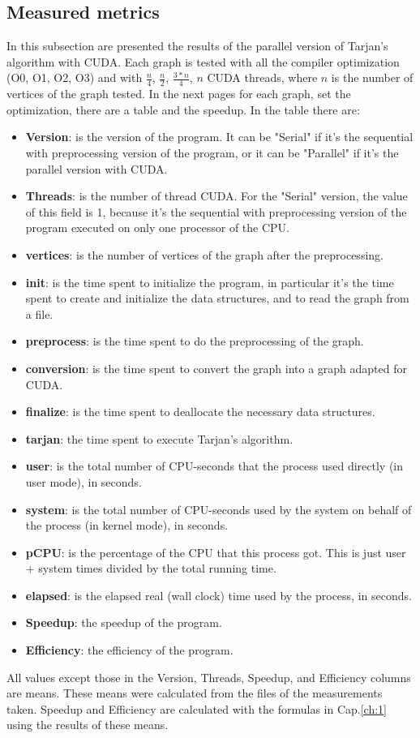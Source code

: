 \subsection{Measured metrics}
In this subsection are presented the results of the parallel version of Tarjan's algorithm with CUDA.
Each graph is tested with all the compiler optimization (O0, O1, O2, O3) and with $\frac{n}{4}$, $\frac{n}{2}$, $\frac{3*n}{4}$, $n$ CUDA threads, where $n$ is the number of vertices of the graph tested.  
In the next pages for each graph, set the optimization, there are a table and the speedup.
In the table there are:
\begin{itemize}
    \item \textbf{Version}: is the version of the program. It can be "Serial" if it's the sequential with preprocessing version of the program, or it can be "Parallel" if it's the parallel version with CUDA.
    \item \textbf{Threads}: is the number of thread CUDA. For the "Serial" version, the value of this field is 1, because it's the sequential with preprocessing version of the program executed on only one processor of the CPU.
    \item \textbf{vertices}: is the number of vertices of the graph after the preprocessing.
    \item \textbf{init}: is the time spent to initialize the program, in particular it's the time spent to create and initialize the data structures, and to read the graph from a file.
    \item \textbf{preprocess}: is the time spent to do the preprocessing of the graph.
    \item \textbf{conversion}: is the time spent to convert the graph into a graph adapted for CUDA.
    \item \textbf{finalize}: is the time spent to deallocate the necessary data structures.
    \item \textbf{tarjan}: the time spent to execute Tarjan's algorithm.
    \item \textbf{user}: is the total number of CPU-seconds that the process used directly (in user mode), in seconds.
    \item \textbf{system}: is the total number of CPU-seconds used by the system on behalf of the process (in kernel mode), in seconds.
    \item \textbf{pCPU}: is the percentage of the CPU that this process got. This is just user + system times divided by the total running time.
    \item \textbf{elapsed}: is the elapsed real (wall clock) time used by the process, in seconds.
    \item \textbf{Speedup}: the speedup of the program.
    \item \textbf{Efficiency}: the efficiency of the program.
\end{itemize}
All values except those in the Version, Threads, Speedup, and Efficiency columns are means. These means were calculated from the files of the measurements taken.
Speedup and Efficiency are calculated with the formulas in Cap.\ref{ch:1} using the results of these means.

